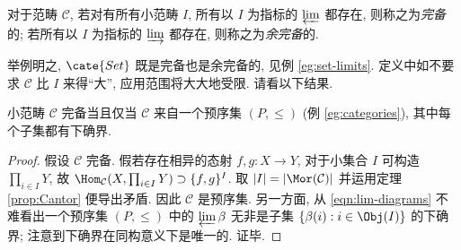 \begin{definition}\label{def:completeness}
	对于范畴 $\mathcal{C}$, 若对有所有小范畴 $I$, 所有以 $I$ 为指标的 $\varprojlim$ 都存在, 则称之为\emph{完备}的; 若所有以 $I$ 为指标的 $\varinjlim$ 都存在, 则称之为\emph{余完备}的.
\end{definition}
举例明之, $\cate{Set}$ 既是完备也是余完备的, 见例 \ref{eg:set-limits}. 定义中如不要求 $\mathcal{C}$ 比 $I$ 来得``大'', 应用范围将大大地受限. 请看以下结果.
\begin{proposition}[P.\ Freyd]\label{prop:preorder-complete}
	小范畴 $\mathcal{C}$ 完备当且仅当 $\mathcal{C}$ 来自一个预序集 $(P, \leq)$ (例 \ref{eg:categories}), 其中每个子集都有下确界.
\end{proposition}
\begin{proof}
	假设 $\mathcal{C}$ 完备. 假若存在相异的态射 $f, g: X \to Y$, 对于小集合 $I$ 可构造 $\prod_{i \in I} Y$, 故 $\Hom_{\mathcal{C}}(X, \prod_{i \in I} Y) \supset \{f, g\}^I$. 取 $|I| = |\Mor(\mathcal{C})|$ 并运用定理 \ref{prop:Cantor} 便导出矛盾. 因此 $\mathcal{C}$ 是预序集. 另一方面, 从 \eqref{eqn:lim-diagrams} 不难看出一个预序集 $(P, \leq)$ 中的 $\varprojlim \beta$ 无非是子集 $\{\beta(i) : i \in \Obj(I) \}$ 的下确界; 注意到下确界在同构意义下是唯一的. 证毕.
\end{proof}


